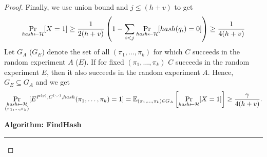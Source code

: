 \begin{proof}
Finally, we use union bound and $j \leq (h+v)$ to get
\begin{align*}
\underset{\textit{hash} \leftarrow \mathcal{H}}{\Pr}[X=1] \geq
\frac{1}{2(h+v)} \left( 1 - \sum_{i < j} \underset{\textit{hash} \leftarrow \mathcal{H}}{\Pr}[hash(q_i) = 0] \right) \geq \frac{1}{4(h+v)}
\end{align*}
Let $G_A$ ($G_E$) denote the set of all $(\pi_1, \dots, \pi_k)$ for which $C$ succeeds in the random experiment $A$ ($E$).
If for fixed $(\pi_1, \dots, \pi_k)$ $C$ succeeds in the random experiment $E$, then it also succeeds in the random experiment $A$.
Hence, $G_E \subseteq G_A$ and we get
\begin{align}
  \label{ineq:hash_high_prob}
\underset{\substack{\textit{hash} \leftarrow \mathcal{H} \\ (\pi_1, \dots, \pi_k)}}{\Pr}[E^{P^{(g)}, C^{(\cdot, \cdot)}, hash}(\pi_1, \dots, \pi_k) = 1] =
\mathbb{E}_{(\pi_1, \dots, \pi_k) \in G_A}\left[\underset{\substack{\textit{hash} \leftarrow \mathcal{H}}}{\Pr}[X = 1]\right]
\geq \frac{\gamma}{4(h+v)}.
\end{align}
%
\begin{codeblock}
  \textbf{Algorithm: FindHash}
  \medskip
  \hrule
  \medskip


\end{codeblock}
\end{proof}
